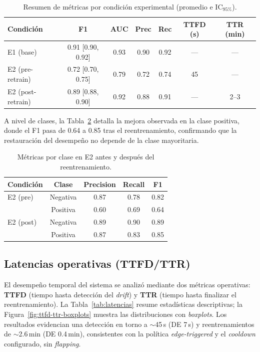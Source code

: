 \begin{table}[htbp]
\centering
\caption{Resumen de métricas por condición experimental (promedio e IC$_{95\%}$).}
\label{tab:eval-resumen}
\begin{tabular}{lcccccc}
\toprule
\textbf{Condición} & \textbf{F1} & \textbf{AUC} & \textbf{Prec} & \textbf{Rec} & \textbf{TTFD (s)} & \textbf{TTR (min)} \\
\midrule
E1 (base)           & 0.91 [0.90, 0.92] & 0.93 & 0.90 & 0.92 & --- & --- \\
E2 (pre-retrain)    & 0.72 [0.70, 0.75] & 0.79 & 0.72 & 0.74 & 45  & --- \\
E2 (post-retrain)   & 0.89 [0.88, 0.90] & 0.92 & 0.88 & 0.91 & --- & 2--3 \\
\bottomrule
\end{tabular}
\end{table}

A nivel de clases, la Tabla~\ref{tab:eval-clase} detalla la mejora observada en la clase positiva,
donde el F1 pasa de 0.64 a 0.85 tras el reentrenamiento, confirmando que la restauración del desempeño no depende de la clase mayoritaria.

\begin{table}[htbp]
\centering
\caption{Métricas por clase en E2 antes y después del reentrenamiento.}
\label{tab:eval-clase}
\begin{tabular}{lcccc}
\toprule
\textbf{Condición} & \textbf{Clase} & \textbf{Precision} & \textbf{Recall} & \textbf{F1} \\
\midrule
E2 (pre)  & Negativa & 0.87 & 0.78 & 0.82 \\
          & Positiva & 0.60 & 0.69 & 0.64 \\
\midrule
E2 (post) & Negativa & 0.89 & 0.90 & 0.89 \\
          & Positiva & 0.87 & 0.83 & 0.85 \\
\bottomrule
\end{tabular}
\end{table}

\subsection{Latencias operativas (TTFD/TTR)}
\label{subsec:latencias}

El desempeño temporal del sistema se analizó mediante dos métricas operativas: 
\textbf{TTFD} (tiempo hasta detección del \textit{drift}) y \textbf{TTR} (tiempo hasta finalizar el reentrenamiento). 
La Tabla~\ref{tab:latencias} resume estadísticas descriptivas; la Figura~\ref{fig:ttfd-ttr-boxplots} muestra las distribuciones con \textit{boxplots}. 
Los resultados evidencian una detección en torno a $\sim$45\,s (DE 7\,s) y reentrenamientos de $\sim$2.6\,min (DE 0.4\,min), consistentes con la política \textit{edge-triggered} y el \textit{cooldown} configurado, sin \textit{flapping}.

